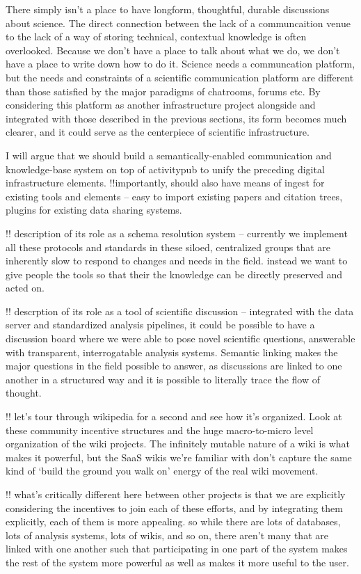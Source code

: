 \documentclass[10pt]{article}
\begin{document}
\begin{multicols}{2}
There simply isn't a place to have longform, thoughtful, durable
discussions about science. The direct connection between the lack of a
communcaition venue to the lack of a way of storing technical,
contextual knowledge is often overlooked. Because we don't have a place
to talk about what we do, we don't have a place to write down how to do
it. Science needs a communcation platform, but the needs and constraints
of a scientific communication platform are different than those
satisfied by the major paradigms of chatrooms, forums etc. By
considering this platform as another infrastructure project alongside
and integrated with those described in the previous sections, its form
becomes much clearer, and it could serve as the centerpiece of
scientific infrastructure.

I will argue that we should build a semantically-enabled communication
and knowledge-base system on top of activitypub to unify the preceding
digital infrastructure elements. !!importantly, should also have means
of ingest for existing tools and elements -- easy to import existing
papers and citation trees, plugins for existing data sharing systems.

!! description of its role as a schema resolution system -- currently we
implement all these protocols and standards in these siloed, centralized
groups that are inherently slow to respond to changes and needs in the
field. instead we want to give people the tools so that their the
knowledge can be directly preserved and acted on.

!! descrption of its role as a tool of scientific discussion --
integrated with the data server and standardized analysis pipelines, it
could be possible to have a discussion board where we were able to pose
novel scientific questions, answerable with transparent, interrogatable
analysis systems. Semantic linking makes the major questions in the
field possible to answer, as discussions are linked to one another in a
structured way and it is possible to literally trace the flow of
thought.

!! let's tour through wikipedia for a second and see how it's organized.
Look at these community incentive structures and the huge macro-to-micro
level organization of the wiki projects. The infinitely mutable nature
of a wiki is what makes it powerful, but the SaaS wikis we're familiar
with don't capture the same kind of `build the ground you walk on'
energy of the real wiki movement.

!! what's critically different here between other projects is that we
are explicitly considering the incentives to join each of these efforts,
and by integrating them explicitly, each of them is more appealing. so
while there are lots of databases, lots of analysis systems, lots of
wikis, and so on, there aren't many that are linked with one another
such that participating in one part of the system makes the rest of the
system more powerful as well as makes it more useful to the user.


\end{multicols}
\end{document}
